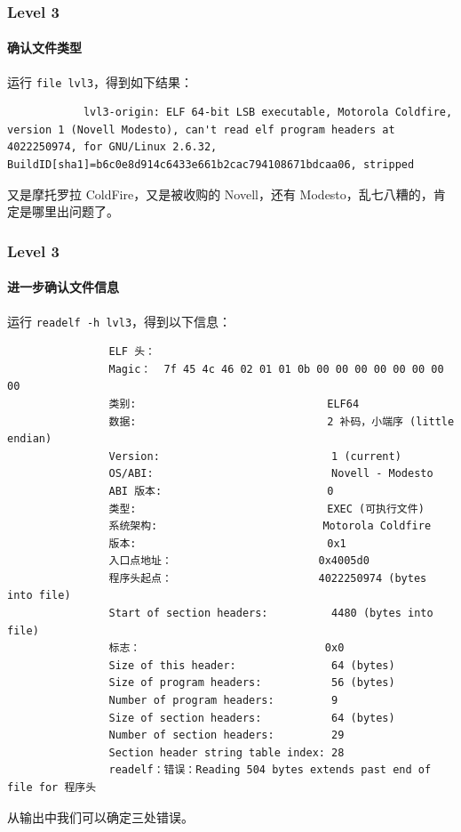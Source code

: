 \documentclass{ctexbeamer}
\begin{document}
    \begin{frame}[fragile]
        \frametitle{Level 3}
        \framesubtitle{确认文件类型} 
    
        运行 \texttt{file lvl3}，得到如下结果：\pause

        \begin{verbatim}
            lvl3-origin: ELF 64-bit LSB executable, Motorola Coldfire, version 1 (Novell Modesto), can't read elf program headers at 4022250974, for GNU/Linux 2.6.32, BuildID[sha1]=b6c0e8d914c6433e661b2cac794108671bdcaa06, stripped
        \end{verbatim}
        \pause

        又是摩托罗拉 ColdFire，又是被收购的 Novell，还有 Modesto，乱七八糟的，肯定是哪里出问题了。
    
    \end{frame}

    \begin{frame}[fragile]
        \frametitle{Level 3}
        \framesubtitle{进一步确认文件信息}
    
        运行 \texttt{readelf -h lvl3}，得到以下信息：

        {
            \tiny
            \begin{verbatim}
                ELF 头：
                Magic：  7f 45 4c 46 02 01 01 0b 00 00 00 00 00 00 00 00 
                类别:                              ELF64
                数据:                              2 补码，小端序 (little endian)
                Version:                           1 (current)
                OS/ABI:                            Novell - Modesto
                ABI 版本:                          0
                类型:                              EXEC (可执行文件)
                系统架构:                          Motorola Coldfire
                版本:                              0x1
                入口点地址：                       0x4005d0
                程序头起点：                       4022250974 (bytes into file)
                Start of section headers:          4480 (bytes into file)
                标志：                             0x0
                Size of this header:               64 (bytes)
                Size of program headers:           56 (bytes)
                Number of program headers:         9
                Size of section headers:           64 (bytes)
                Number of section headers:         29
                Section header string table index: 28
                readelf：错误：Reading 504 bytes extends past end of file for 程序头
            \end{verbatim}
        }
        
        \pause 从输出中我们可以确定三处错误。
    
    \end{frame}
\end{document}
